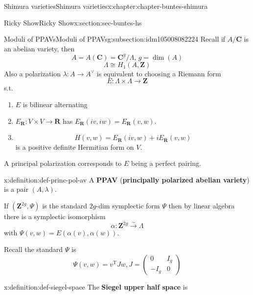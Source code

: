 \documentclass[oneside,10pt,]{book}
\newcommand{\terminology}[1]{\textbf{#1}}
\numberwithin{equation}{section}
\newcommand{\ZZ}{\mathbf{Z}}
\newcommand{\RR}{\mathbf{R}}
\newcommand{\CC}{\mathbf{C}}
\newcommand{\transpose}{\mathrm{T}}
\newcommand{\amp}{&}
\begin{document}
\begin{chapterptx}{Shimura varieties}{}{Shimura varieties}{}{}{x:chapter:chapter-buntes-shimura}
\begin{sectionptx}{Ricky Show}{}{Ricky Show}{}{}{x:section:sec-buntes-hs}
\typeout{************************************************}
%
\begin{subsectionptx}{Moduli of PPAVs}{}{Moduli of PPAVs}{}{}{g:subsection:idm105008082224}
Recall if \(A/ \CC\) is an abelian variety,  then%
\begin{equation*}
A = A(\CC) =  \CC^g/ \Lambda, \,g = \dim (A)
\end{equation*}
%
\begin{equation*}
\Lambda \cong H_1(A,\ZZ)
\end{equation*}
Also a polarization \(\lambda \colon A \to A^\vee\) is equivalent to choosing a Riemann form%
\begin{equation*}
E \colon \Lambda \times \Lambda \to \ZZ
\end{equation*}
s.t.%
\begin{enumerate}
\item{}\(E\) is bilinear alternating%
\item{}\(E_\RR \colon V\times V \to \RR\) has \(E_\RR(iv,iw)  = E_\RR( v,w)\).%
\item{}%
\begin{equation*}
H(v,w) = E_\RR(iv, w) + i E_\RR(v,w)
\end{equation*}
is a positive definite Hermitian form on \(V\).%
\end{enumerate}
A principal polarization corresponds to \(E\) being a perfect pairing.%
\begin{definition}{}{x:definition:def-princ-pol-av}%
A \terminology{PPAV} (\terminology{principally polarized abelian variety}) is a pair \((A,\lambda)\).%
\end{definition}
If \((\ZZ^{2g}, \Psi)\) is the standard \(2g\)-dim symplectic form \(\Psi\) then by linear algebra there is a symplectic isomorphism%
\begin{equation*}
\alpha \colon \ZZ^{2g} \xrightarrow\sim \Lambda
\end{equation*}
with \(\Psi(v,w) = E(\alpha(v), \alpha(w))\).%
\par
Recall the standard \(\Psi\) is%
\begin{equation*}
\Psi (v,w) = v^\transpose J w, J = \begin{pmatrix} 0 \amp I_g \\ -I_g \amp 0\end{pmatrix}
\end{equation*}
%
\begin{definition}{}{x:definition:def-siegel-space}%
The \terminology{Siegel upper half space} is%

\end{definition}
\end{subsectionptx}
\end{sectionptx}
\end{chapterptx}
\end{document}
